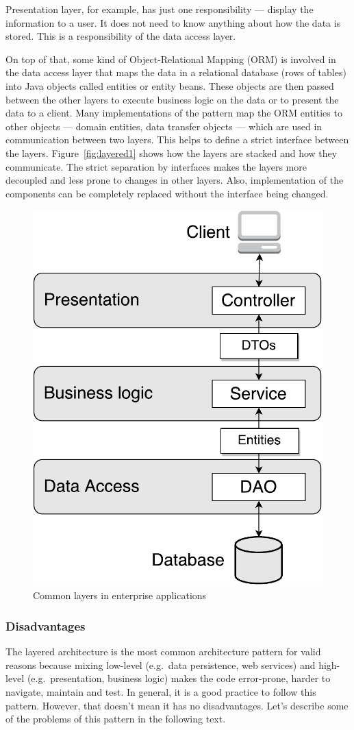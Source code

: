 \documentclass{book}
\begin{document}
Presentation layer, for example, has just one responsibility --- display
the information to a user. It does not need to know anything about how
the data is stored. This is a responsibility of the data access layer.

On top of that, some kind of Object-Relational Mapping (ORM) is involved
in the data access layer that maps the data in a relational database
(rows of tables) into Java objects called entities or entity beans.
These objects are then passed between the other layers to execute
business logic on the data or to present the data to a client. Many
implementations of the pattern map the ORM entities to other objects ---
domain entities, data transfer objects --- which are used in
communication between two layers. This helps to define a strict
interface between the layers. Figure~\ref{fig:layered1} shows how the
layers are stacked and how they communicate. The strict separation by
interfaces makes the layers more decoupled and less prone to changes in
other layers. Also, implementation of the components can be completely
replaced without the interface being changed.


\begin{figure}[h!]
\begin{center}
\includegraphics[width=0.42\columnwidth]{figures/layered1/layered1}
\caption{Common layers in enterprise applications%
}
\end{center}
\end{figure}

\subsubsection{Disadvantages}\label{disadvantages}

The layered architecture is the most common architecture pattern for
valid reasons because mixing low-level (e.g.~data persistence, web
services) and high-level (e.g.~presentation, business logic) makes the
code error-prone, harder to navigate, maintain and test. In general, it
is a good practice to follow this pattern. However, that doesn't mean it
has no disadvantages. Let's describe some of the problems of this
pattern in the following text.
\end{document}
